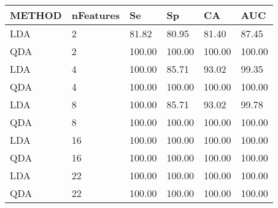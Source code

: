 \begin{table}[!ht]
    \centering
    \begin{tabular}{|l|l|l|l|l|l|}
    \hline
        METHOD & nFeatures & Se & Sp & CA & AUC \\ \hline
        LDA & 2 & 81.82 & 80.95 & 81.40 & 87.45 \\ \hline
        QDA & 2 & 100.00 & 100.00 & 100.00 & 100.00 \\ \hline
        LDA & 4 & 100.00 & 85.71 & 93.02 & 99.35 \\ \hline
        QDA & 4 & 100.00 & 100.00 & 100.00 & 100.00 \\ \hline
        LDA & 8 & 100.00 & 85.71 & 93.02 & 99.78 \\ \hline
        QDA & 8 & 100.00 & 100.00 & 100.00 & 100.00 \\ \hline
        LDA & 16 & 100.00 & 100.00 & 100.00 & 100.00 \\ \hline
        QDA & 16 & 100.00 & 100.00 & 100.00 & 100.00 \\ \hline
        LDA & 22 & 100.00 & 100.00 & 100.00 & 100.00 \\ \hline
        QDA & 22 & 100.00 & 100.00 & 100.00 & 100.00 \\ \hline
    \end{tabular}
\end{table}